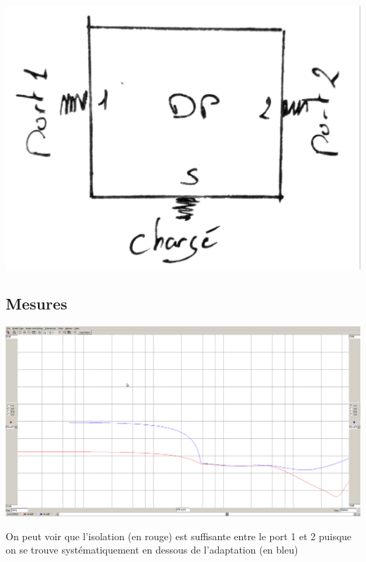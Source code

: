 \documentclass[a4paper,12pt]{report}            %
\begin{document}
\begin{center}
	\includegraphics[scale = 0.15]{pic/DP12.png} \\\end{center}

\subsection{Mesures}
\begin{center}\includegraphics[scale = 0.25]{pic/isolation_dp12.png}\\ \end{center}
On peut voir que l'isolation (en rouge) est suffisante entre le port 1 et 2 puisque on se trouve systématiquement
en dessous de l'adaptation (en bleu)
\end{document}
